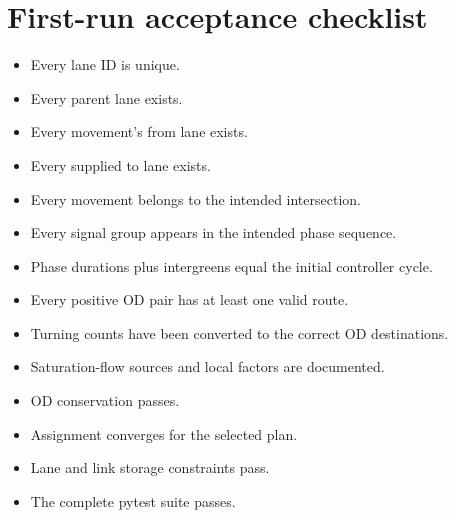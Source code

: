\chapter{First-run acceptance checklist}
\begin{itemize}[leftmargin=*]
\item Every lane ID is unique.
\item Every parent lane exists.
\item Every movement's from lane exists.
\item Every supplied to lane exists.
\item Every movement belongs to the intended intersection.
\item Every signal group appears in the intended phase sequence.
\item Phase durations plus intergreens equal the initial controller cycle.
\item Every positive OD pair has at least one valid route.
\item Turning counts have been converted to the correct OD destinations.
\item Saturation-flow sources and local factors are documented.
\item OD conservation passes.
\item Assignment converges for the selected plan.
\item Lane and link storage constraints pass.
\item The complete pytest suite passes.
\end{itemize}
